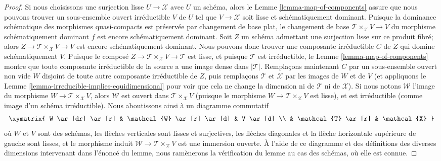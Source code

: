 \begin{proof}
\medskip\noindent
Si nous choisissons une surjection lisse $U \to \mathcal{X}$ avec $U$ un schéma,
alors le Lemme \ref{lemma-map-of-components} assure que
nous pouvons trouver un sous-ensemble ouvert irréductible $V$ de $U$ tel
que $V \to \mathcal{X}$ soit lisse et schématiquement dominant.
Puisque la dominance schématique des morphismes quasi-compacts
est préservée par changement de base plat,
le changement de base $\mathcal{T} \times_{\mathcal{X}} V \to V$
du morphisme schématiquement
dominant $f$ est encore
schématiquement dominant. Soit $Z$ un schéma
admettant une surjection lisse sur ce produit fibré;
alors $Z \to \mathcal{T} \times_{\mathcal{X}} V \to V$
est encore schématiquement dominant.
Nous pouvons donc trouver une composante
irréductible $C$ de $Z$ qui domine
schématiquement $V$.
Puisque le composé $Z \to \mathcal{T}\times_{\mathcal{X}} V \to \mathcal{T}$
est lisse,
et puisque $\mathcal{T}$ est irréductible,
le Lemme \ref{lemma-map-of-components} montre que toute composante irréductible
de la source a une image dense dans $|\mathcal{T}|$.
Remplaçons maintenant
$C$ par un sous-ensemble ouvert non vide $W$ disjoint de toute autre
composante irréductible de $Z$, puis
remplaçons $\mathcal{T}$ et $\mathcal{X}$ par les images de $W$
et de $V$
(et appliquons le Lemme \ref{lemma-irreducible-implies-equidimensional}
pour voir que cela
ne change la dimension ni de $\mathcal{T}$ ni de $\mathcal{X}$).
Si nous notons $\mathcal{W}$ l'image du morphisme
$W \to \mathcal{T}\times_{\mathcal{X}} V$,
alors $\mathcal{W}$ est ouvert dans $\mathcal{T}\times_{\mathcal{X}} V$ (puisque le
morphisme $W \to \mathcal{T}\times_{\mathcal{X}} V$ est lisse),
et est irréductible (comme image d'un schéma
irréductible). Nous aboutissons ainsi à un diagramme commutatif
$$
\xymatrix{
W \ar[dr] \ar[r]  & \mathcal{W} \ar[r] \ar[d] & V \ar[d] \\
& \mathcal{T} \ar[r] & \mathcal{X}
}
$$
où $W$ et $V$ sont des schémas,
les flèches verticales sont lisses et surjectives,
les flèches diagonales et la flèche horizontale
supérieure de gauche sont lisses,
et le morphisme induit $\mathcal{W} \to \mathcal{T}\times_{\mathcal{X}} V$ est
une immersion ouverte. À l'aide de ce diagramme et des définitions
des diverses dimensions intervenant dans
l'énoncé du lemme, nous ramènerons la vérification
du lemme au cas des schémas, où elle est connue.


\end{proof}

